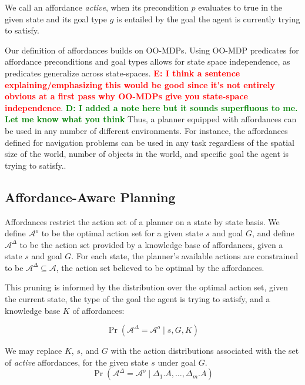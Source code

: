 \documentclass[conference]{IEEEtran}
\newcommand{\dnote}[1]{\textcolor{Green}{\textbf{D: #1}}}
\newcommand{\enote}[1]{\textcolor{Red}{\textbf{E: #1}}}
\begin{document}
We call an affordance {\it active}, when its precondition $p$ evaluates to true in the given state and its goal type $g$ is entailed
by the goal the agent is currently trying to satisfy.

Our definition of affordances builds on OO-MDPs. Using OO-MDP predicates for affordance
preconditions and goal types allows for state space independence, as predicates generalize across state-spaces. 
\enote{I think a sentence explaining/emphasizing this would be good since it's not entirely obvious at a first pass why OO-MDPs give you state-space independence}. \dnote{I added a note here but it sounds superfluous to me. Let me know what you think} 
Thus, a planner equipped with affordances can be used in any number of
different environments. For instance, the affordances defined for navigation problems 
can be used in any task regardless of the spatial size of the world, number of objects in 
the world, and specific goal the agent is trying to satisfy..

\subsection{Affordance-Aware Planning}
Affordances restrict the action set of a planner on a state by state basis. We define 
$\mathcal{A}^o$ to be the optimal action set for a given state $s$ and goal $G$, and define
$\mathcal{A}^\Delta$ to be the action set provided by a knowledge base of affordances, given a state $s$ and goal $G$.
For each state, the planner's available actions are constrained to be 
$\mathcal{A}^{\Delta} \subseteq \mathcal{A}$, the action set
believed to be optimal by the affordances.

This pruning is informed by the distribution over the optimal action set, given the current state,
the type of the goal the agent is trying to satisfy, and a knowledge base $K$ of affordances:

\begin{equation}
\Pr(\mathcal{A}^\Delta = \mathcal{A}^o \mid s, G, K)
\end{equation}

We may replace $K$, $s$, and $G$ with the action distributions associated with the set of {\it active} affordances, for the given state $s$ under goal $G$.
\begin{equation}
\Pr(\mathcal{A}^\Delta = \mathcal{A}^o \mid \Delta_1.A, \ldots, \Delta_m.A)
\end{equation}
\end{document}
